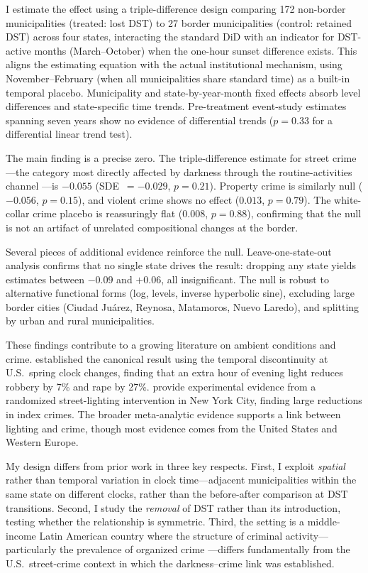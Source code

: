 \documentclass[12pt]{article}
\begin{document}
I estimate the effect using a triple-difference design comparing 172 non-border municipalities (treated: lost DST) to 27 border municipalities (control: retained DST) across four states, interacting the standard DiD with an indicator for DST-active months (March--October) when the one-hour sunset difference exists. This aligns the estimating equation with the actual institutional mechanism, using November--February (when all municipalities share standard time) as a built-in temporal placebo. Municipality and state-by-year-month fixed effects absorb level differences and state-specific time trends. Pre-treatment event-study estimates spanning seven years show no evidence of differential trends ($p = 0.33$ for a differential linear trend test).

The main finding is a precise zero. The triple-difference estimate for street crime---the category most directly affected by darkness through the routine-activities channel \citep{cornwell1994}---is $-0.055$ (SDE~$= -0.029$, $p = 0.21$). Property crime is similarly null ($-0.056$, $p = 0.15$), and violent crime shows no effect ($0.013$, $p = 0.79$). The white-collar crime placebo is reassuringly flat ($0.008$, $p = 0.88$), confirming that the null is not an artifact of unrelated compositional changes at the border.

Several pieces of additional evidence reinforce the null. Leave-one-state-out analysis confirms that no single state drives the result: dropping any state yields estimates between $-0.09$ and $+0.06$, all insignificant. The null is robust to alternative functional forms (log, levels, inverse hyperbolic sine), excluding large border cities (Ciudad Ju\'arez, Reynosa, Matamoros, Nuevo Laredo), and splitting by urban and rural municipalities.

These findings contribute to a growing literature on ambient conditions and crime. \citet{doleac2015} established the canonical result using the temporal discontinuity at U.S.\ spring clock changes, finding that an extra hour of evening light reduces robbery by 7\% and rape by 27\%. \citet{chalfin2022} provide experimental evidence from a randomized street-lighting intervention in New York City, finding large reductions in index crimes. The broader meta-analytic evidence \citep{welsh2008} supports a link between lighting and crime, though most evidence comes from the United States and Western Europe.

My design differs from prior work in three key respects. First, I exploit \textit{spatial} rather than temporal variation in clock time---adjacent municipalities within the same state on different clocks, rather than the before-after comparison at DST transitions. Second, I study the \textit{removal} of DST rather than its introduction, testing whether the relationship is symmetric. Third, the setting is a middle-income Latin American country where the structure of criminal activity---particularly the prevalence of organized crime \citep{dell2015, castillo2020}---differs fundamentally from the U.S.\ street-crime context in which the darkness--crime link was established.
\end{document}
